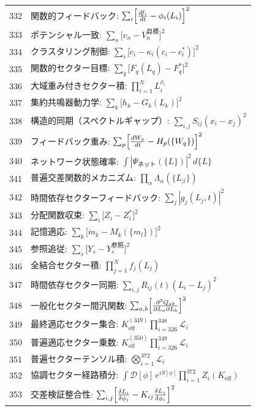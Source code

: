 \documentclass[13pt,a4paper]{ltjsarticle}
\begin{document}
\begin{longtable}{r l}
		332 & 関数的フィードバック: $\sum_i\Bigl[\frac{df_i}{dt} - \phi_i(L_i)\Bigr]^2$ \\
		333 & ポテンシャル一致: $\sum_n\bigl[v_n - V_n^{\text{目標}}\bigr]^2$ \\
		334 & クラスタリング制御: $\sum_i\bigl[\dot c_i - \kappa_i(c_i - c_i^*)\bigr]^2$ \\
		335 & 関数的セクター目標: $\sum_q\bigl[F_q(L_q) - F_q^*\bigr]^2$ \\
		336 & 大域重み付きセクター積: $\prod_{i=1}^N L_i^{\rho_i}$ \\
		337 & 集約共鳴器動力学: $\sum_k\bigl[h_k - G_k(L_k)\bigr]^2$ \\
		338 & 構造的同期（スペクトルギャップ）: $\sum_{i,j}S_{ij}(x_i - x_j)^2$ \\
		339 & フィードバック重み: $\sum_p\Bigl[\frac{dW_p}{dt} - H_p(\{W_q\})\Bigr]^2$ \\
		340 & ネットワーク状態確率: $\int|\Psi_{\text{ネット}}(\{L\})|^2\,d\{L\}$ \\
		341 & 普遍交差関数的メカニズム: $\prod_\alpha\Lambda_\alpha(\{L_\beta\})$ \\
		342 & 時間依存セクターフィードバック: $\sum_j|g_j(L_j,t)|^2$ \\
		343 & 分配関数収束: $\sum_i\bigl[Z_i - Z_i^*\bigr]^2$ \\
		344 & 記憶適応: $\sum_k\bigl[\dot m_k - M_k(\{m_l\})\bigr]^2$ \\
		345 & 参照追従: $\sum_s\bigl[Y_s - Y_s^{\text{参照}}\bigr]^2$ \\
		346 & 全結合セクター積: $\prod_{j=1}^N f_j(L_j)$ \\
		347 & 時間依存セクター同期: $\sum_{i,j}R_{ij}(t)(L_i - L_j)^2$ \\
		348 & 一般化セクター間汎関数: $\sum_{a,b}\Bigl[\frac{\partial^2 Q_{ab}}{\partial L_a\partial L_b}\Bigr]^2$ \\
		349 & 最終適応セクター集合: $K^{(349)}_{\mathrm{eff}}\prod_{i=326}^{348}\mathcal{L}_i$ \\
		350 & 普遍適応セクター乗数: $K^{(350)}_{\mathrm{eff}}\prod_{i=326}^{349}\mathcal{L}_i$ \\
		351 & 普遍セクターテンソル積: $\bigotimes_{i=1}^{372}\mathcal{L}_i$ \\
		352 & 協調セクター経路積分: $\int\mathcal{D}[\phi]\,e^{iS[\phi]}\prod_{i=1}^{372}Z_i(K_{\mathrm{eff}})$ \\
		353 & 交差検証整合性: $\sum_{i,j}\Bigl[\frac{\delta L_i}{\delta\phi_j} - K_{ij}\frac{\delta L_j}{\delta\phi_i}\Bigr]^2$ \\

\end{longtable}
\end{document}
